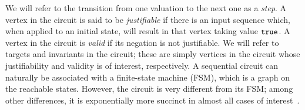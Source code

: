 

%

%
We will refer to the transition from one valuation
to the next one as a {\em step}.  A vertex in the circuit is
said to be \emph{justifiable} if there is an input sequence which, when
applied to an initial state, will result in that vertex
taking value $\mathtt{true}$.  A vertex in the circuit is
\emph{valid} if its negation is not justifiable.  We will refer
to targets and invariants in the circuit; these are simply
vertices in the circuit whose justifiability and validity
is of interest, respectively.
A sequential circuit can naturally
be associated with a finite-state machine (FSM),
which is a graph on the reachable states.  However, the 
circuit is very different from its FSM; among
other differences, it is exponentially more succinct in
almost all cases of interest~\cite{BuClMcDiHw92}. 
%
%
